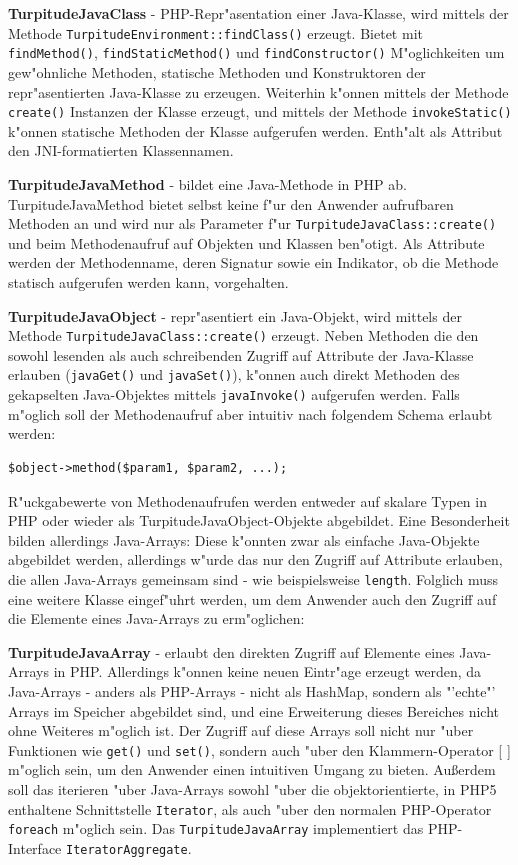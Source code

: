 \textbf{TurpitudeJavaClass} - PHP-Repr"asentation einer Java-Klasse, wird mittels der Methode \texttt{TurpitudeEnvironment::findClass()} erzeugt.
Bietet mit \texttt{findMethod()}, \texttt{findStaticMethod()} und \texttt{findConstructor()} M"oglichkeiten um gew"ohnliche Methoden, statische
Methoden und Konstruktoren der repr"asentierten Java-Klasse zu erzeugen. Weiterhin k"onnen mittels der Methode \texttt{create()} Instanzen
der Klasse erzeugt, und mittels der Methode \texttt{invokeStatic()} k"onnen statische Methoden der Klasse aufgerufen werden.
Enth"alt als Attribut den JNI-formatierten Klassennamen. 

\textbf{TurpitudeJavaMethod} - bildet eine Java-Methode in PHP ab. TurpitudeJavaMethod bietet selbst keine 
f"ur den Anwender aufrufbaren Methoden an und wird nur
als Parameter f"ur \texttt{TurpitudeJavaClass::create()} und beim Methodenaufruf auf Objekten und Klassen ben"otigt.
Als Attribute werden der Methodenname, deren Signatur sowie ein Indikator, ob die Methode statisch aufgerufen werden kann, vorgehalten.

\textbf{TurpitudeJavaObject} - repr"asentiert ein Java-Objekt, wird mittels der Methode \texttt{TurpitudeJavaClass::create()} erzeugt. Neben Methoden
die den sowohl lesenden als auch schreibenden Zugriff auf Attribute der Java-Klasse erlauben (\texttt{javaGet()} und \texttt{javaSet()}), k"onnen
auch direkt Methoden des gekapselten Java-Objektes mittels \texttt{javaInvoke()} aufgerufen werden. Falls m"oglich soll der Methodenaufruf aber
intuitiv nach folgendem Schema erlaubt werden:
\begin{lstlisting}[caption=angestrebte Syntax zum Aufruf von Java-Methoden in PHP]
$object->method($param1, $param2, ...);
\end{lstlisting}
R"uckgabewerte von Methodenaufrufen werden entweder auf skalare Typen in PHP oder wieder als TurpitudeJavaObject-Objekte abgebildet.
Eine Besonderheit bilden allerdings Java-Arrays: Diese k"onnten zwar als einfache Java-Objekte abgebildet werden, allerdings w"urde das 
nur den Zugriff auf Attribute erlauben, die allen Java-Arrays gemeinsam sind - wie beispielsweise \texttt{length}. Folglich muss eine weitere
Klasse eingef"uhrt werden, um dem Anwender auch den Zugriff auf die Elemente eines Java-Arrays zu erm"oglichen:

\textbf{TurpitudeJavaArray} - erlaubt den direkten Zugriff auf Elemente eines Java-Arrays in PHP. Allerdings k"onnen keine neuen Eintr"age
erzeugt werden, da Java-Arrays - anders als PHP-Arrays - nicht als HashMap, sondern als "'echte"' Arrays im Speicher abgebildet
sind, und eine Erweiterung dieses Bereiches nicht ohne Weiteres m"oglich ist. Der Zugriff auf diese Arrays soll nicht nur "uber 
Funktionen wie \texttt{get()} und \texttt{set()}, sondern auch "uber den Klammern-Operator [ ] m"oglich sein, um den Anwender einen
intuitiven Umgang zu bieten. Au\ss erdem soll das iterieren "uber Java-Arrays sowohl "uber die objektorientierte, in PHP5
enthaltene Schnittstelle \texttt{Iterator}, als auch "uber den normalen PHP-Operator \texttt{foreach} m"oglich sein. Das
\texttt{TurpitudeJavaArray} implementiert das PHP-Interface \texttt{IteratorAggregate}.

